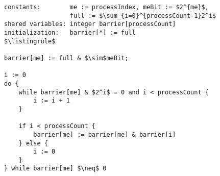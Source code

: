 \begin{lstlisting}[mathescape]
constants:        me := processIndex, meBit := $2^{me}$,
                  full := $\sum_{i=0}^{processCount-1}2^i$
shared variables: integer barrier[processCount]
initialization:   barrier[*] := full
$\listingrule$

barrier[me] := full & $\sim$meBit;

i := 0
do {
	while barrier[me] & $2^i$ = 0 and i < processCount {
		i := i + 1
	}

	if i < processCount {
		barrier[me] := barrier[me] & barrier[i]
	} else {
		i := 0
	}
} while barrier[me] $\neq$ 0
\end{lstlisting}
